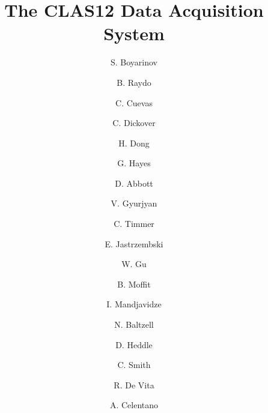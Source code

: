 \title{The CLAS12 Data Acquisition System}

\author[A]{S. Boyarinov}
\author[A]{B. Raydo}
\author[A]{C. Cuevas}
\author[A]{C. Dickover}
\author[A]{H. Dong}
\author[A]{G. Hayes}
\author[A]{D. Abbott}
\author[A]{V. Gyurjyan}
\author[A]{C. Timmer}
\author[A]{E. Jastrzembski}
\author[A]{W. Gu}
\author[A]{B. Moffit}
\author[B]{I. Mandjavidze}
\author[A]{N. Baltzell}
\author[A]{D. Heddle}
\author[A]{C. Smith}
\author[C]{R. De Vita}
\author[C]{A. Celentano}

\address[A]{Thomas Jefferson National Accelerator Facility, Newport News, VA, USA}
\address[B]{Sacley, France}
\address[C]{INFN, Milan, Italy}
